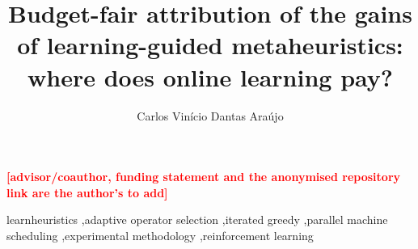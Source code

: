 \documentclass[preprint,12pt,authoryear]{elsarticle}
\newif\ifdraftmarks \draftmarkstrue
\newcommand{\todonote}[1]{\ifdraftmarks\textcolor{red}{\textbf{[#1]}}\fi}
\begin{document}
\begin{frontmatter}

\title{Budget-fair attribution of the gains of learning-guided metaheuristics: where does online learning pay?}

\author{Carlos Vin\'icio Dantas Ara\'ujo}
\address{Graduate Program in Computer Science, State University of Cear\'a (UECE), Fortaleza, Brazil}
\todonote{advisor/coauthor, funding statement and the anonymised repository link are the author's to add}

\begin{abstract}

\end{abstract}

\begin{keyword}
learnheuristics \sep adaptive operator selection \sep iterated greedy \sep parallel machine scheduling \sep experimental methodology \sep reinforcement learning
\end{keyword}
\end{frontmatter}

\onehalfspacing









\end{document}
